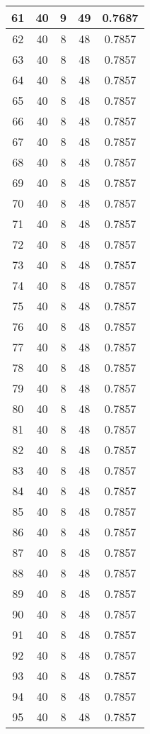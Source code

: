 \documentclass[letterpaper, 12pt]{article}
\begin{document}
\begin{longtable}{|c|c|c|c|c|}
\hline
61 & 40 & 9 & 49 & 0.7687 \\
\hline
62 & 40 & 8 & 48 & 0.7857 \\
\hline
63 & 40 & 8 & 48 & 0.7857 \\
\hline
64 & 40 & 8 & 48 & 0.7857 \\
\hline
65 & 40 & 8 & 48 & 0.7857 \\
\hline
66 & 40 & 8 & 48 & 0.7857 \\
\hline
67 & 40 & 8 & 48 & 0.7857 \\
\hline
68 & 40 & 8 & 48 & 0.7857 \\
\hline
69 & 40 & 8 & 48 & 0.7857 \\
\hline
70 & 40 & 8 & 48 & 0.7857 \\
\hline
71 & 40 & 8 & 48 & 0.7857 \\
\hline
72 & 40 & 8 & 48 & 0.7857 \\
\hline
73 & 40 & 8 & 48 & 0.7857 \\
\hline
74 & 40 & 8 & 48 & 0.7857 \\
\hline
75 & 40 & 8 & 48 & 0.7857 \\
\hline
76 & 40 & 8 & 48 & 0.7857 \\
\hline
77 & 40 & 8 & 48 & 0.7857 \\
\hline
78 & 40 & 8 & 48 & 0.7857 \\
\hline
79 & 40 & 8 & 48 & 0.7857 \\
\hline
80 & 40 & 8 & 48 & 0.7857 \\
\hline
81 & 40 & 8 & 48 & 0.7857 \\
\hline
82 & 40 & 8 & 48 & 0.7857 \\
\hline
83 & 40 & 8 & 48 & 0.7857 \\
\hline
84 & 40 & 8 & 48 & 0.7857 \\
\hline
85 & 40 & 8 & 48 & 0.7857 \\
\hline
86 & 40 & 8 & 48 & 0.7857 \\
\hline
87 & 40 & 8 & 48 & 0.7857 \\
\hline
88 & 40 & 8 & 48 & 0.7857 \\
\hline
89 & 40 & 8 & 48 & 0.7857 \\
\hline
90 & 40 & 8 & 48 & 0.7857 \\
\hline
91 & 40 & 8 & 48 & 0.7857 \\
\hline
92 & 40 & 8 & 48 & 0.7857 \\
\hline
93 & 40 & 8 & 48 & 0.7857 \\
\hline
94 & 40 & 8 & 48 & 0.7857 \\
\hline
95 & 40 & 8 & 48 & 0.7857 \\

\end{longtable}
\end{document}
